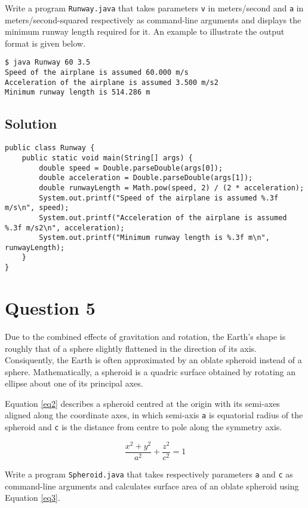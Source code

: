 Write a program \texttt{Runway.java} that takes parameters \texttt{v} in meters/second and \texttt{a} in meters/second-squared respectively as command-line arguments and displays the minimum runway length required for it. An example to illustrate the output format is given below.

\begin{verbatim}
$ java Runway 60 3.5
Speed of the airplane is assumed 60.000 m/s
Acceleration of the airplane is assumed 3.500 m/s2
Minimum runway length is 514.286 m
\end{verbatim}

\subsection*{Solution}
\lstset{language=Java,tabsize=2}
\begin{lstlisting}
public class Runway {
	public static void main(String[] args) {
		double speed = Double.parseDouble(args[0]);
		double acceleration = Double.parseDouble(args[1]);
		double runwayLength = Math.pow(speed, 2) / (2 * acceleration);
		System.out.printf("Speed of the airplane is assumed %.3f m/s\n", speed);
		System.out.printf("Acceleration of the airplane is assumed %.3f m/s2\n", acceleration);
		System.out.printf("Minimum runway length is %.3f m\n", runwayLength);
	}
}
\end{lstlisting}

\section*{Question 5}
Due to the combined effects of gravitation and rotation, the Earth's shape is roughly that of a sphere slightly flattened in the direction of its axis. Consiquently, the Earth is often approximated by an oblate spheroid instead of a sphere. Mathematically, a spheroid is a quadric surface obtained by rotating an ellipse about one of its principal axes.

Equation \ref{eq2} describes a spheroid centred at the origin with its semi-axes aligned along the coordinate axes, in which semi-axis \texttt{a} is equatorial radius of the spheroid and \texttt{c} is the distance from centre to pole along the symmetry axis.

\begin{equation}
\frac{x^2+y^2}{a^2} + \frac{z^2}{c^2} = 1
\label{eq2}
\end{equation}

Write a program \texttt{Spheroid.java} that takes respectively parameters \texttt{a} and \texttt{c} as command-line arguments and calculates surface area of an oblate spheroid using Equation \ref{eq3}.

